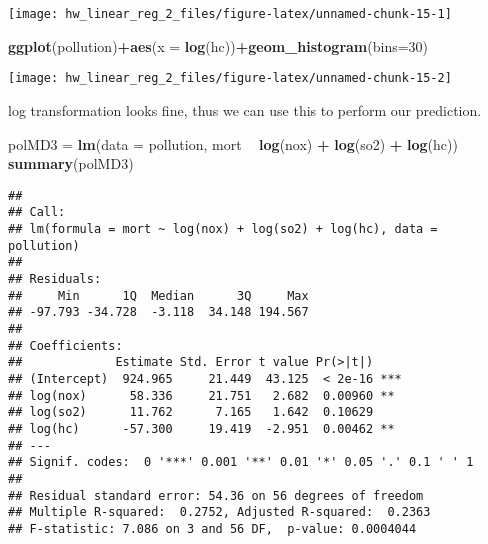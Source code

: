 \documentclass[]{article}
\newenvironment{Shaded}{\begin{snugshade}}{\end{snugshade}}
\newcommand{\DataTypeTok}[1]{\textcolor[rgb]{0.13,0.29,0.53}{#1}}
\newcommand{\DecValTok}[1]{\textcolor[rgb]{0.00,0.00,0.81}{#1}}
\newcommand{\KeywordTok}[1]{\textcolor[rgb]{0.13,0.29,0.53}{\textbf{#1}}}
\newcommand{\NormalTok}[1]{#1}
\newcommand{\OperatorTok}[1]{\textcolor[rgb]{0.81,0.36,0.00}{\textbf{#1}}}
\newcommand{\StringTok}[1]{\textcolor[rgb]{0.31,0.60,0.02}{#1}}
\begin{document}
\begin{center}\texttt{[image: hw\_linear\_reg\_2\_files/figure-latex/unnamed-chunk-15-1]} \end{center}

\begin{Shaded}
\begin{Highlighting}[]
\KeywordTok{ggplot}\NormalTok{(pollution)}\OperatorTok{+}\KeywordTok{aes}\NormalTok{(}\DataTypeTok{x =} \KeywordTok{log}\NormalTok{(hc))}\OperatorTok{+}\KeywordTok{geom_histogram}\NormalTok{(}\DataTypeTok{bins=}\DecValTok{30}\NormalTok{)}
\end{Highlighting}
\end{Shaded}

\begin{center}\texttt{[image: hw\_linear\_reg\_2\_files/figure-latex/unnamed-chunk-15-2]} \end{center}

log transformation looks fine, thus we can use this to perform our
prediction.

\begin{Shaded}
\begin{Highlighting}[]
\NormalTok{polMD3 =}\StringTok{ }\KeywordTok{lm}\NormalTok{(}\DataTypeTok{data =}\NormalTok{ pollution, mort }\OperatorTok{~}\StringTok{ }\KeywordTok{log}\NormalTok{(nox) }\OperatorTok{+}\StringTok{ }\KeywordTok{log}\NormalTok{(so2) }\OperatorTok{+}\StringTok{ }\KeywordTok{log}\NormalTok{(hc))}
\KeywordTok{summary}\NormalTok{(polMD3)}
\end{Highlighting}
\end{Shaded}

\begin{verbatim}
## 
## Call:
## lm(formula = mort ~ log(nox) + log(so2) + log(hc), data = pollution)
## 
## Residuals:
##     Min      1Q  Median      3Q     Max 
## -97.793 -34.728  -3.118  34.148 194.567 
## 
## Coefficients:
##             Estimate Std. Error t value Pr(>|t|)    
## (Intercept)  924.965     21.449  43.125  < 2e-16 ***
## log(nox)      58.336     21.751   2.682  0.00960 ** 
## log(so2)      11.762      7.165   1.642  0.10629    
## log(hc)      -57.300     19.419  -2.951  0.00462 ** 
## ---
## Signif. codes:  0 '***' 0.001 '**' 0.01 '*' 0.05 '.' 0.1 ' ' 1
## 
## Residual standard error: 54.36 on 56 degrees of freedom
## Multiple R-squared:  0.2752, Adjusted R-squared:  0.2363 
## F-statistic: 7.086 on 3 and 56 DF,  p-value: 0.0004044
\end{verbatim}
\end{document}
